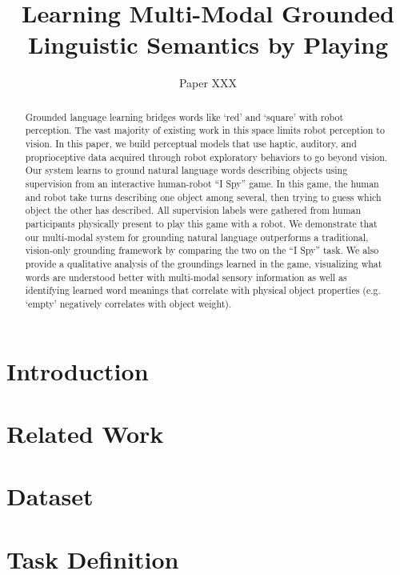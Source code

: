 \documentclass{article}
\title{Learning Multi-Modal Grounded Linguistic Semantics by Playing \ispy}
\author{Paper XXX}
\newcommand{\ispy}{``I Spy''\xspace}
\begin{document}
\maketitle

\begin{abstract}
Grounded language learning bridges words like `red' and `square' with robot perception.
The vast majority of existing work in this space limits robot perception to vision.
In this paper, we build perceptual models that use haptic, auditory, and proprioceptive data acquired through robot exploratory behaviors to go beyond vision.
Our system learns to ground natural language words describing objects using supervision from an interactive human-robot \ispy game.
In this game, the human and robot take turns describing one object among several, then trying to guess which object the other has described.
All supervision labels were gathered from human participants physically present to play this game with a robot.
We demonstrate that our multi-modal system for grounding natural language outperforms a traditional, vision-only grounding framework by comparing the two on the \ispy task.
We also provide a qualitative analysis of the groundings learned in the game, visualizing what words are understood better with multi-modal sensory information as well as identifying learned word meanings that correlate with physical object properties (e.g. `empty' negatively correlates with object weight).
\end{abstract}

\section{Introduction}
\label{sec:introduction}
	

\section{Related Work}
\label{sec:relatedwork}
	

\section{Dataset}
\label{sec:dataset}
	

\section{Task Definition}
\label{sec:taskdefinition}
	
\end{document}
